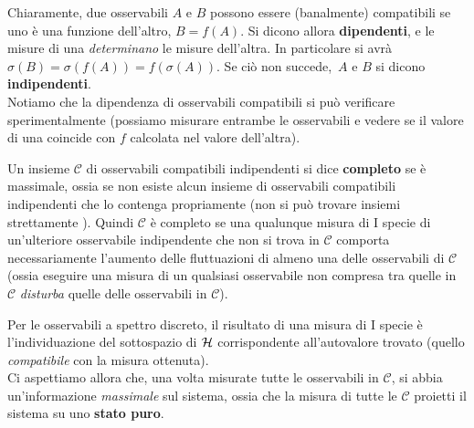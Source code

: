 \documentclass[../../FisicaTeorica.tex]{subfiles}
\begin{document}
Chiaramente, due osservabili $A$ e $B$ possono essere (banalmente) compatibili se uno è una funzione dell'altro, $B=f(A)$. Si dicono allora \textbf{dipendenti}, e le misure di una \textit{determinano} le misure dell'altra.
In particolare si avrà $\sigma(B)=\sigma(f(A))=f(\sigma(A))$. Se ciò non succede,\ $A$ e $B$ si dicono \textbf{indipendenti}.\\
Notiamo che la dipendenza di osservabili compatibili si può verificare sperimentalmente (possiamo misurare entrambe le osservabili e vedere se il valore di una coincide con $f$ calcolata nel valore dell'altra).\\
\begin{dfn}
Un insieme $\mathcal{C}$ di osservabili compatibili indipendenti si dice \textbf{completo} se è massimale, ossia se non esiste alcun insieme di osservabili compatibili indipendenti che lo contenga propriamente (non si può trovare insiemi strettamente ). Quindi $\mathcal{C}$ è completo se una qualunque misura di I specie di un'ulteriore osservabile indipendente che non si trova in $\mathcal{C}$ comporta necessariamente l'aumento delle fluttuazioni di almeno una delle osservabili di $\mathcal{C}$ (ossia eseguire una misura di un qualsiasi osservabile non compresa tra quelle in $\mathcal{C}$ \textit{disturba} quelle delle osservabili in $\mathcal{C}$).
\end{dfn}
Per le osservabili a spettro discreto, il risultato di una misura di I specie è l'individuazione del sottospazio di $\mathcal{H}$ corrispondente all'autovalore trovato (quello \textit{compatibile} con la misura ottenuta).\\
Ci aspettiamo allora che, una volta misurate tutte le osservabili in $\mathcal{C}$, si abbia un'informazione \textit{massimale} sul sistema, ossia che la misura di tutte le $\mathcal{C}$ proietti il sistema su uno \textbf{stato puro}.
\end{document}
